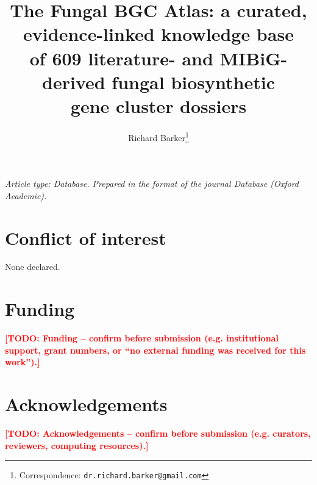 \documentclass[11pt]{article}
\title{\textbf{The Fungal BGC Atlas: a curated, evidence-linked knowledge base\\
of 609 literature- and MIBiG-derived fungal biosynthetic\\
gene cluster dossiers}}
\author[1]{Richard Barker\thanks{Correspondence: \texttt{dr.richard.barker@gmail.com}}}
\affil[1]{University of Wisconsin--Madison, Madison, WI, USA}
\date{}
\newcommand{\todo}[1]{\textcolor{red}{\textbf{[TODO: #1]}}}
\begin{document}
\doublespacing
\linenumbers
\maketitle
\begin{center}
\textit{Article type: Database. Prepared in the format of the journal \emph{Database} (Oxford Academic).}
\end{center}



\newpage






\section*{Conflict of interest}
None declared.

\section*{Funding}
\todo{Funding -- confirm before submission (e.g. institutional support, grant numbers, or ``no external funding was received for this work'').}

\section*{Acknowledgements}
\todo{Acknowledgements -- confirm before submission (e.g. curators, reviewers, computing resources).}



\end{document}
